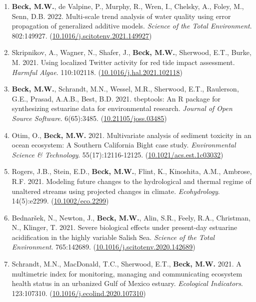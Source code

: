 \documentclass[letterpaper,12pt]{article}
\begin{document}
\begin{enumerate}
\item \textbf{Beck, M.W.}, de Valpine, P., Murphy, R., Wren, I., Chelsky, A., Foley, M., Senn, D.B. 2022. Multi-scale trend analysis of water quality using error propagation of generalized additive models. \textit{Science of the Total Environment}. 802:149927. ({\footnotesize\href{https://doi.org/10.1016/j.scitotenv.2021.149927}{10.1016/j.scitotenv.2021.149927}})

\item Skripnikov, A., Wagner, N., Shafer, J., \textbf{Beck, M.W.}, Sherwood, E.T., Burke, M. 2021. Using localized Twitter activity for red tide impact assessment. \textit{Harmful Algae}. 110:102118. ({\footnotesize\href{https://doi.org/10.1016/j.hal.2021.102118}{10.1016/j.hal.2021.102118}})

\item \textbf{Beck, M.W.}, Schrandt, M.N., Wessel, M.R., Sherwood, E.T., Raulerson, G.E., Prasad, A.A.B., Best, B.D. 2021. tbeptools: An R package for synthesizing estuarine data for environmental research. \textit{Journal of Open Source Software}. 6(65):3485. ({\footnotesize\href{https://doi.org/10.21105/joss.03485}{10.21105/joss.03485}})

\item Otim, O., \textbf{Beck, M.W.} 2021. Multivariate analysis of sediment toxicity in an ocean ecosystem: A Southern California Bight case study. \textit{Environmental Science \& Technology}. 55(17):12116-12125. ({\footnotesize\href{https://doi.org/10.1021/acs.est.1c03032}{10.1021/acs.est.1c03032}})

\item Rogers, J.B., Stein, E.D., \textbf{Beck, M.W.}, Flint, K., Kinoshita, A.M., Ambrose, R.F. 2021. Modeling future changes to the hydrological and thermal regime of unaltered streams using projected changes in climate. \textit{Ecohydrology}. 14(5):e2299. ({\footnotesize\href{https://doi.org/10.1002/eco.2299}{10.1002/eco.2299}})

\item Bednar\v{s}ek, N., Newton, J., \textbf{Beck, M.W.}, Alin, S.R., Feely, R.A., Christman, N., Klinger, T. 2021. Severe biological effects under present-day estuarine acidification in the highly variable {S}alish {S}ea. \textit{Science of the Total Environment}. 765:142689. ({\footnotesize\href{https://doi.org/10.1016/j.scitotenv.2020.142689}{10.1016/j.scitotenv.2020.142689}})

\item Schrandt, M.N., MacDonald, T.C., Sherwood, E.T., \textbf{Beck, M.W.} 2021. A multimetric index for monitoring, managing and communicating ecosystem health status in an urbanized Gulf of Mexico estuary. \textit{Ecological Indicators}. 123:107310. ({\footnotesize\href{https://doi.org/10.1016/j.ecolind.2020.107310}{10.1016/j.ecolind.2020.107310}})


\end{enumerate}
\end{document}
